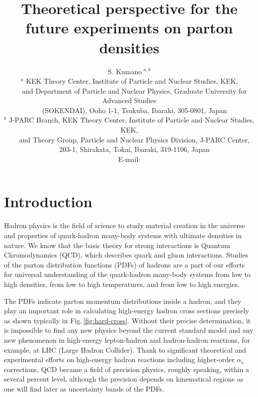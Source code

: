 \documentclass{PoS}
\title{Theoretical perspective for the future experiments on parton densities}
\author{S. Kumano$^{\,\, a,b}$ \\
$^a$ KEK Theory Center, Institute of Particle and Nuclear Studies, KEK,\\
\ \ \            and Department of Particle and Nuclear Physics,
Graduate University for Advanced Studies \\
\ \ \  (SOKENDAI),       Ooho 1-1, Tsukuba, Ibaraki, 305-0801, Japan\\ 
$^b$ J-PARC Branch, KEK Theory Center,
     Institute of Particle and Nuclear Studies, KEK,\\
\ \ \ and Theory Group, Particle and Nuclear Physics Division, J-PARC Center,\\
\ \ \ 203-1, Shirakata, Tokai, Ibaraki, 319-1106, Japan\\
        E-mail: \email{shunzo.kumano@kek.jp}}
\begin{document}
\section{Introduction}

Hadron physics is the field of science to study 
material creation in the universe and 
properties of quark-hadron many-body systems 
with ultimate densities in nature.
We know that the basic theory for strong interactions is 
Quantum Chromodynamics (QCD), which describes
quark and gluon interactions. 
Studies of the parton distribution functions 
(PDFs) of hadrons are a part of our efforts for universal 
understanding of the quark-hadron many-body systems 
from low to high densities, from low to high temperatures, 
and from low to high energies.

The PDFs indicate parton momentum distributions 
inside a hadron, and they play an important role in calculating
high-energy hadron cross sections precisely as shown typically
in Fig.\,\ref{fig:hard-cross}.
Without their precise determination, it is impossible to find
any new physics beyond the current standard model and any new
phenomenon in high-energy lepton-hadron and hadron-hadron
reactions, for example, at LHC (Large Hadron Collider).
Thank to significant theoretical and experimental efforts 
on high-energy hadron reactions including higher-order 
$\alpha_s$ corrections, QCD became a field of precision physics, 
roughly speaking, within a several percent level, 
although the precision depends on kinematical regions 
as one will find later as uncertainty bands of the PDFs.
\end{document}
